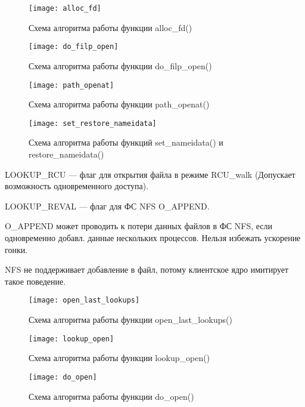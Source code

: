 \pagebreak

\begin{figure}[ht!]
	\centering
	\texttt{[image: alloc\_fd]}
	\caption{Схема алгоритма работы функции alloc\_fd()}
\end{figure}

\pagebreak

\begin{figure}[ht!]
	\centering
	\texttt{[image: do\_filp\_open]}
	\caption{Схема алгоритма работы функции do\_filp\_open()}
\end{figure}

\pagebreak

\begin{figure}[ht!]
	\centering
	\texttt{[image: path\_openat]}
	\caption{Схема алгоритма работы функции path\_openat()}
\end{figure}

\pagebreak

\begin{figure}[ht!]
	\centering
	\texttt{[image: set\_restore\_nameidata]}
	\caption{Схема алгоритма работы функций set\_nameidata() и restore\_nameidata()}
\end{figure}


LOOKUP\_RCU --- флаг для открытия файла в режиме RCU\_walk (Допускает
возможность одновременного доступа).

LOOKUP\_REVAL --- флаг для ФС NFS O\_APPEND.

O\_APPEND может проводить к потери данных файлов в ФС NFS,
если одновременно добавл. данные нескольких процессов.
Нельзя избежать ускорение гонки.

NFS не поддерживает добавление в файл, потому клиентское ядро имитирует такое поведение.

\pagebreak



\begin{figure}[ht!]
	\centering
	\texttt{[image: open\_last\_lookups]}
	\caption{Схема алгоритма работы функции open\_last\_lookups()}
\end{figure}


\begin{figure}[ht!]
	\centering
	\texttt{[image: lookup\_open]}
	\caption{Схема алгоритма работы функции lookup\_open()}
\end{figure}

\begin{figure}[ht!]
	\centering
	\texttt{[image: do\_open]}
	\caption{Схема алгоритма работы функции do\_open()}
\end{figure}

